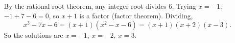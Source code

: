 By the rational root theorem, any integer root divides $6$. Trying $x=-1$: $-1+7-6=0$, so $x+1$ is a factor (factor theorem). Dividing,
\[x^3-7x-6=(x+1)(x^2-x-6)=\boxed{(x+1)(x+2)(x-3)}.\]
So the solutions are $\boxed{x=-1,\ x=-2,\ x=3}$.
